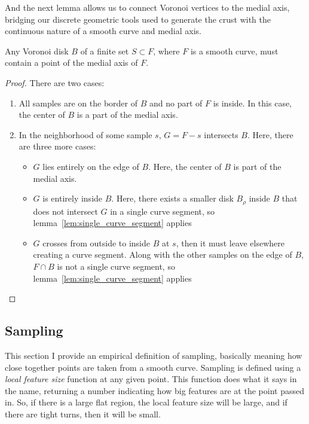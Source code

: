 And the next lemma allows us to connect Voronoi vertices to the medial axis, bridging our discrete geometric tools used to generate the crust with the continuous nature of a smooth curve and medial axis.


\begin{lemma}
	Any Voronoi disk $B$ of a finite set $S \subset F$, where $F$ is a smooth curve, must contain a point of the medial axis of $F$.
	\label{lem:voronoi_disk_contains_m}
\end{lemma}

\begin{proof}
	There are two cases:
	\begin{enumerate}
		\item{All samples are on the border of $B$ and no part of $F$ is inside.
		      In this case, the center of $B$ is a part of the medial axis.}
		\item{In the neighborhood of some sample $s$, $G=F-s$ intersects $B$. Here, there are three more cases:}
		      \begin{itemize}
			      \item{$G$ lies entirely on the edge of $B$. Here, the center of $B$ is part of the medial axis.}
			      \item{$G$ is entirely inside $B$. Here, there exists a smaller disk $B_\rho$ inside $B$ that does not intersect $G$ in a single curve segment, so lemma~\ref{lem:single_curve_segment} applies}
			      \item{$G$ crosses from outside to inside $B$ at $s$, then it must leave elsewhere creating a curve segment. Along with the other samples on the edge of $B$, $F\cap B$ is not a single curve segment, so lemma~\ref{lem:single_curve_segment} applies}
		      \end{itemize}
	\end{enumerate}
\end{proof}

\subsection{Sampling}

This section I provide an empirical definition of sampling, basically meaning how close together points are taken from a smooth curve.
Sampling is defined using a \textit{local feature size} function at any given point.
This function does what it says in the name, returning a number indicating how big features are at the point passed in.
So, if there is a large flat region, the local feature size will be large, and if there are tight turns, then it will be small.

